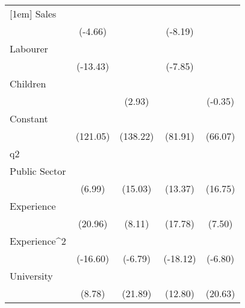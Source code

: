 {\begin{tabular}{l*{4}{c}}
[1em]
Sales               &            \sym{***}&                     &            \sym{***}&                     \\
                    &     (-4.66)         &                     &     (-8.19)         &                     \\
[1em]
Labourer            &            \sym{***}&                     &            \sym{***}&                     \\
                    &    (-13.43)         &                     &     (-7.85)         &                     \\
[1em]
Children            &                     &            \sym{**} &                     &                     \\
                    &                     &      (2.93)         &                     &     (-0.35)         \\
[1em]
Constant            &            \sym{***}&            \sym{***}&            \sym{***}&            \sym{***}\\
                    &    (121.05)         &    (138.22)         &     (81.91)         &     (66.07)         \\
\hline
q2                  &                     &                     &                     &                     \\
Public Sector       &            \sym{***}&            \sym{***}&            \sym{***}&            \sym{***}\\
                    &      (6.99)         &     (15.03)         &     (13.37)         &     (16.75)         \\
[1em]
Experience          &            \sym{***}&            \sym{***}&            \sym{***}&            \sym{***}\\
                    &     (20.96)         &      (8.11)         &     (17.78)         &      (7.50)         \\
[1em]
Experience^{2}      &            \sym{***}&            \sym{***}&            \sym{***}&            \sym{***}\\
                    &    (-16.60)         &     (-6.79)         &    (-18.12)         &     (-6.80)         \\
[1em]
University          &            \sym{***}&            \sym{***}&            \sym{***}&            \sym{***}\\
                    &      (8.78)         &     (21.89)         &     (12.80)         &     (20.63)         \\

\end{tabular}}
